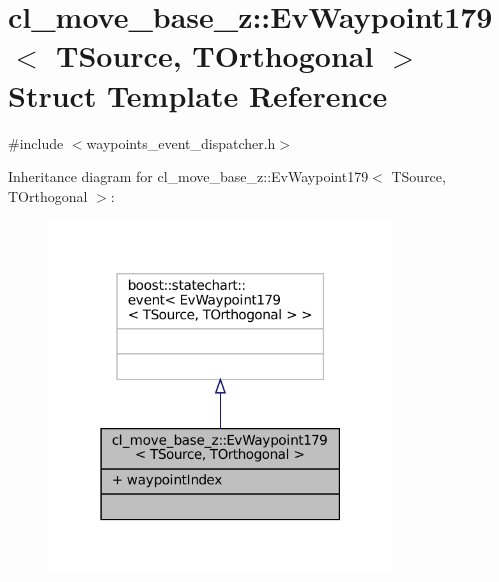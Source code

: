\hypertarget{structcl__move__base__z_1_1EvWaypoint179}{}\section{cl\+\_\+move\+\_\+base\+\_\+z\+:\+:Ev\+Waypoint179$<$ T\+Source, T\+Orthogonal $>$ Struct Template Reference}
\label{structcl__move__base__z_1_1EvWaypoint179}


{\ttfamily \#include $<$waypoints\+\_\+event\+\_\+dispatcher.\+h$>$}



Inheritance diagram for cl\+\_\+move\+\_\+base\+\_\+z\+:\+:Ev\+Waypoint179$<$ T\+Source, T\+Orthogonal $>$\+:
\nopagebreak
\begin{figure}[H]
\begin{center}
\leavevmode
\includegraphics[width=259pt]{structcl__move__base__z_1_1EvWaypoint179__inherit__graph}
\end{center}
\end{figure}


